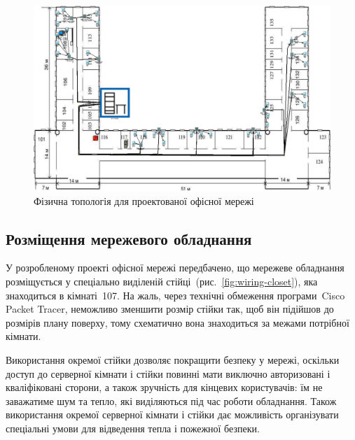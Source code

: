 \documentclass[
  ukrainian,
  simple,
  floatsection,
]{eskdnaukvd}
\begin{document}
      \begin{figure}[!htbp]
        \centering
        \includegraphics[width = \columnwidth]{./assets/06-net-topology-physical.png}
        \caption{Фізична топологія для проектованої офісної мережі}
        \label{fig:net-topology-physical}
      \end{figure}

    \subsection{Розміщення мережевого обладнання}
      У розробленому проекті офісної мережі передбачено, що мережеве обладнання розміщується у спеціально виділеній стійці~(рис.~\ref{fig:wiring-closet}), яка знаходиться в кімнаті~107. На жаль, через технічні обмеження програми~\textenglish{Cisco Packet Tracer}, неможливо зменшити розмір стійки так, щоб він підійшов до розмірів плану поверху, тому схематично вона знаходиться за межами потрібної кімнати.

      Використання окремої стійки дозволяє покращити безпеку у мережі, оскільки доступ до серверної кімнати і стійки повинні мати виключно авторизовані і кваліфіковані сторони, а також зручність для кінцевих користувачів: їм не заважатиме шум та тепло, які виділяються під час роботи обладнання. Також використання окремої серверної кімнати і стійки дає можливість організувати спеціальні умови для відведення тепла і пожежної безпеки.
\end{document}
